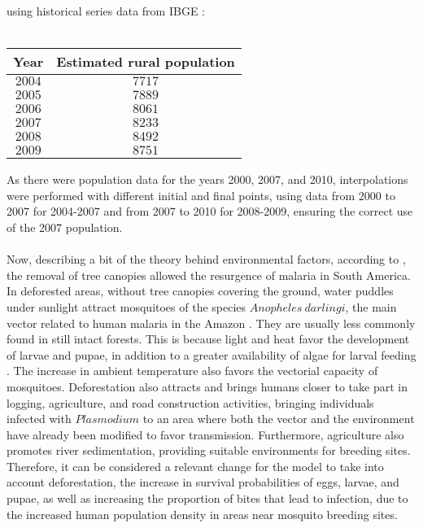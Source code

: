 using historical series data from IBGE \cite{popIBGE}:
\\\\
\begin{adjustwidth}{0cm}{}
\begin{center}
\renewcommand{\arraystretch}{1.5}
\begin{tabular}{|c | c|} 
 \hline
 \textbf{Year} & \textbf{Estimated rural population}\\ 
 \hline
$2004$ & $7717$ \\
 \hline
 $2005$ & $7889$ \\
 \hline
 $2006$ & $8061$ \\
 \hline
 $2007$ & $8233$ \\
 \hline
 $2008$ & $8492$ \\
 \hline
 $2009$ & $8751$ \\
 \hline
\end{tabular}
\end{center}
\end{adjustwidth}

\vspace{1cm}
As there were population data for the years 2000, 2007, and 2010, 
interpolations were performed with different initial and final 
points, using data from 2000 to 2007 for 2004-2007 and from 2007 
to 2010 for 2008-2009, ensuring the correct use of the 2007 population.
\\\\
Now, describing a bit of the theory behind environmental factors, 
according to \cite{Norris2004}, the removal of tree canopies allowed 
the resurgence of malaria in South America. In deforested areas, 
without tree canopies covering the ground, water puddles under sunlight 
attract mosquitoes of the species $Anopheles \ darlingi$, the main vector 
related to human malaria in the Amazon \cite{infoAnopheles}. They are 
usually less commonly found in still intact forests. This is 
because light and heat favor the development of larvae and 
pupae, in addition to a greater availability of algae for 
larval feeding \cite{article_alteracoesambientais}. The increase 
in ambient temperature also favors the vectorial capacity of 
mosquitoes. Deforestation also attracts and brings humans closer 
to take part in logging, agriculture, and road construction 
activities, bringing individuals infected with $Plasmodium$ to 
an area where both the vector and the environment have already 
been modified to favor transmission. Furthermore, agriculture 
also promotes river sedimentation, providing suitable environments 
for breeding sites. Therefore, it can be considered a relevant 
change for the model to take into account deforestation, the 
increase in survival probabilities of eggs, larvae, and pupae, 
as well as increasing the proportion of bites that lead to infection, 
due to the increased human population density in areas near mosquito 
breeding sites.
